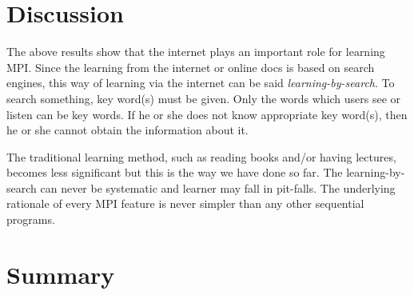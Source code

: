 \documentclass[sigconf,nonacm]{acmart}
\begin{document}

\section{Discussion}

The above results show that the internet plays an important role for
learning MPI. Since the learning from the internet or online docs is
based on search engines, this way of learning via the internet can be said
{\em learning-by-search}. To search something, key word(s) must be
given. Only the words which users see or listen can be key words. If
he or she does not know appropriate key word(s), then he or she cannot
obtain the information about it.

The traditional learning method, such as reading
books and/or having lectures, becomes less significant but this is the way
we have done so far. The learning-by-search can never be systematic and
learner may fall in pit-falls. The underlying rationale of every MPI
feature is never simpler than any other sequential programs. 



\section{Summary}
\end{document}
